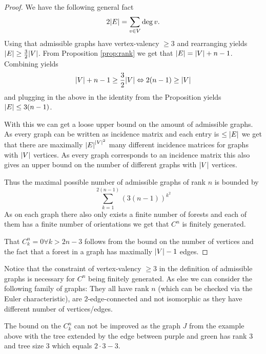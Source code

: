 \begin{proof}
	We have the following general fact
	\[
		2 \abs{E} = \sum_{v \in V} \deg{v}
	.\] 
	Using that admissible graphs have vertex-valency $\geq 3$ and rearranging yields $\abs{E} \geq \frac{3}{2} \abs{V}$.
	From Proposition \ref{prop:rank} we get that $\abs{E} = \abs{V} + n-1$.
	Combining yields
	\[
		\abs{V} + n -1 \geq \frac{3}{2} \abs{V} \Leftrightarrow 2 (n-1) \geq \abs{V}
	\] 
	and plugging in the above in the identity from the Proposition yields $\abs{E} \leq 3 (n-1)$.

	With this we can get a loose upper bound on the amount of admissible graphs.
	As every graph can be written as incidence matrix and each entry is $\leq \abs{E}$ we get that there are maximally
	$\abs{E}^{\abs{V}^2}$ many different incidence matrices for graphs with  $\abs{V}$ vertices.
	As every graph corresponds to an incidence matrix this also gives an upper bound on the number of different graphs with $\abs{V}$ vertices.

	Thus the maximal possible number of admissible graphs of rank $n$ is bounded by
	\[
		\sum_{k=1}^{2(n-1)} (3 (n-1))^{k^2} 
	\] 
	As on each graph there also only exists a finite number of forests and each of them has a finite number of orientations we get that
	$C^{n}$ is finitely generated.

	That $C_{k}^{n} = 0 \forall k > 2n -3$ follows from the bound on the number of vertices and the fact that a forest in a graph has maximally $\abs{V} - 1$ edges.
\end{proof}

\begin{remark}
	Notice that the constraint of vertex-valency $\geq 3$ in the definition of admissible graphs is necessary for $C^{n}$ being finitely generated.
	As else we can consider the following family of graphs:
	They all have rank $n$ (which can be checked via the Euler characteristic), are $2$-edge-connected and not isomorphic as they have different number of vertices/edges.
\end{remark}

\begin{remark}
	The bound on the $C_{k}^{n}$ can not be improved as the graph $J$ from the example above with the tree extended by the edge between purple and green has rank $3$ and
	tree size $3$ which equals $2 \cdot 3 -3$.
\end{remark}

